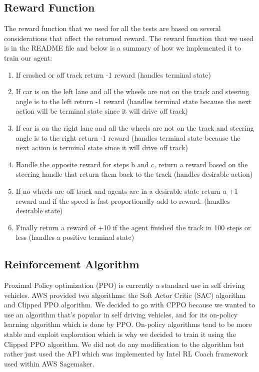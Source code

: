 \documentclass[journal]{IEEEtran}
\begin{document}
\subsection{Reward Function}
The reward function that we used for all the tests are based on several considerations that affect the returned reward.  The reward function that we used is in the README file and below is a summary of how we implemented it to train our agent:

\begin{enumerate}
  \item If crashed or off track return -1 reward (handles terminal state)
  \item If car is on the left lane and all the wheels are not on the track and steering angle is to the left return -1 reward (handles terminal state because the next action will be terminal state since it will drive off track)
  \item If car is on the right lane and all the wheels are not on the track and steering angle is to the right return -1 reward (handles terminal state because the next action is terminal state since it will drive off track)
  \item Handle the opposite reward for steps b and c, return a reward based on the steering handle that return them back to the track (handles desirable action)
  \item If no wheels are off track and agents are in a desirable state return a +1 reward and if the speed is fast proportionally add to reward. (handles desirable state)
  \item Finally return  a reward of +10 if the agent finished the track in 100 steps or less (handles a positive terminal state)
\end{enumerate}

\subsection{Reinforcement Algorithm}
Proximal Policy optimization (PPO) is currently a standard use in self driving vehicles.  AWS provided two algorithms: the Soft Actor Critic (SAC) algorithm and Clipped PPO algorithm.  We decided to go with CPPO because we wanted to use an algorithm that's popular in self driving vehicles, and for its on-policy learning algorithm which is done by PPO.  On-policy algorithms tend to be more stable and exploit exploration which is why we decided to train it using the Clipped PPO algorithm.  We did not do any modification to the algorithm but rather just used the API which was implemented by Intel RL Coach framework used within AWS Sagemaker.
\end{document}
